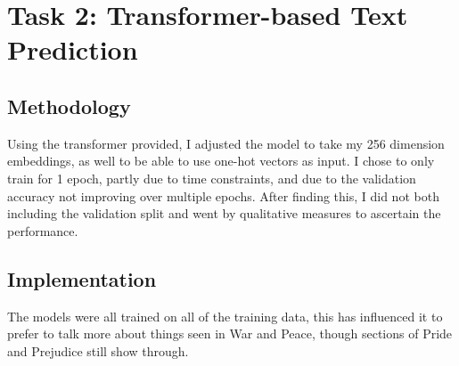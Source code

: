 \documentclass[12pt]{article} \usepackage{COSC420style} \usepackage{soul}
\begin{document}
\section{Task 2: Transformer-based Text Prediction}

\subsection{Methodology}

Using the transformer provided, I adjusted the model to take my 256 dimension embeddings, as well to
be able to use one-hot vectors as input. I chose to only train for 1 epoch, partly due to time
constraints, and due to the validation accuracy not improving over multiple epochs.  After finding
this, I did not both including the validation split and went by qualitative measures to ascertain
the performance.
\subsection{Implementation}

The models were all trained on all of the training data, this has influenced it to prefer to talk
more about things seen in War and Peace, though sections of Pride and Prejudice still show through.
\end{document}
